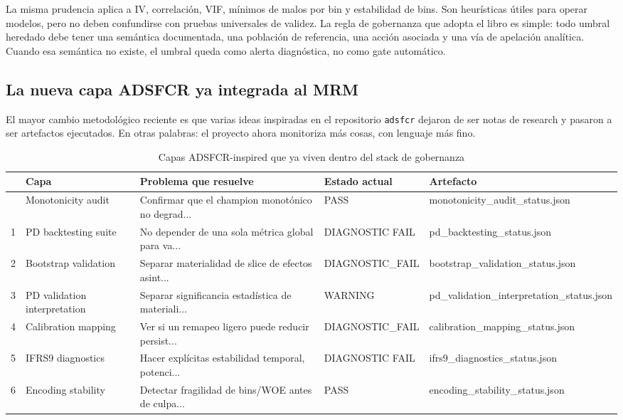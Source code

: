 \documentclass[
  spanish,
  11pt,
  letterpaper,
]{scrbook}
\theoremstyle{plain}
\theoremstyle{remark}
\begin{document}
La misma prudencia aplica a IV, correlación, VIF, mínimos de malos por
bin y estabilidad de bins. Son heurísticas útiles para operar modelos,
pero no deben confundirse con pruebas universales de validez. La regla
de gobernanza que adopta el libro es simple: todo umbral heredado debe
tener una semántica documentada, una población de referencia, una acción
asociada y una vía de apelación analítica. Cuando esa semántica no
existe, el umbral queda como alerta diagnóstica, no como gate
automático.

\subsection{La nueva capa ADSFCR ya integrada al
MRM}\label{la-nueva-capa-adsfcr-ya-integrada-al-mrm}

El mayor cambio metodológico reciente es que varias ideas inspiradas en
el repositorio \texttt{adsfcr} dejaron de ser notas de research y
pasaron a ser artefactos ejecutados. En otras palabras: el proyecto
ahora monitoriza más cosas, con lenguaje más fino.

{

\begin{longtable}[]{@{}lllll@{}}

\caption{\label{tbl-mrm-adsfcr-layers}Capas ADSFCR-inspired que ya viven
dentro del stack de gobernanza}

\tabularnewline

\toprule\noalign{}
& Capa & Problema que resuelve & Estado actual & Artefacto \\
\midrule\noalign{}
\endhead
\bottomrule\noalign{}
\endlastfoot
0 & Monotonicity audit & Confirmar que el champion monotónico no
degrad... & PASS & monotonicity\_audit\_status.json \\
1 & PD backtesting suite & No depender de una sola métrica global para
va... & DIAGNOSTIC FAIL & pd\_backtesting\_status.json \\
2 & Bootstrap validation & Separar materialidad de slice de efectos
asint... & DIAGNOSTIC\_FAIL & bootstrap\_validation\_status.json \\
3 & PD validation interpretation & Separar significancia estadística de
materiali... & WARNING & pd\_validation\_interpretation\_status.json \\
4 & Calibration mapping & Ver si un remapeo ligero puede reducir
persist... & DIAGNOSTIC\_FAIL & calibration\_mapping\_status.json \\
5 & IFRS9 diagnostics & Hacer explícitas estabilidad temporal,
potenci... & DIAGNOSTIC FAIL & ifrs9\_diagnostics\_status.json \\
6 & Encoding stability & Detectar fragilidad de bins/WOE antes de
culpa... & PASS & encoding\_stability\_status.json \\

\end{longtable}

}
\end{document}
